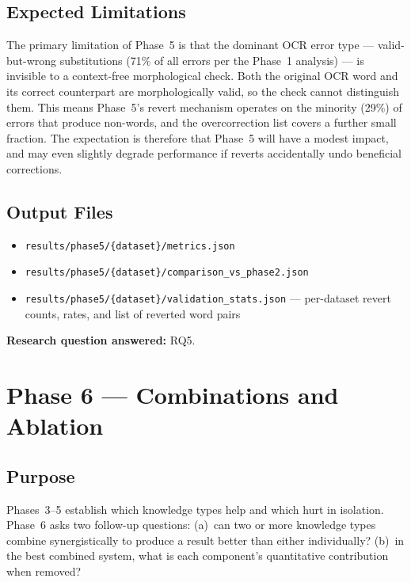\subsection{Expected Limitations}

The primary limitation of Phase~5 is that the dominant OCR error type ---
valid-but-wrong substitutions (71\% of all errors per the Phase~1 analysis)
--- is invisible to a context-free morphological check. Both the original
OCR word and its correct counterpart are morphologically valid, so the
check cannot distinguish them. This means Phase~5's revert mechanism
operates on the minority (29\%) of errors that produce non-words, and the
overcorrection list covers a further small fraction. The expectation is
therefore that Phase~5 will have a modest impact, and may even slightly
degrade performance if reverts accidentally undo beneficial corrections.

\subsection{Output Files}
\begin{itemize}
  \item \texttt{results/phase5/\{dataset\}/metrics.json}
  \item \texttt{results/phase5/\{dataset\}/comparison\_vs\_phase2.json}
  \item \texttt{results/phase5/\{dataset\}/validation\_stats.json} ---
        per-dataset revert counts, rates, and list of reverted word pairs
\end{itemize}

\noindent
\textbf{Research question answered:} RQ5.

\section{Phase 6 --- Combinations and Ablation}
\label{sec:phase6}

\subsection{Purpose}
\label{subsec:phase6_purpose}

Phases~3--5 establish which knowledge types help and which hurt in isolation.
Phase~6 asks two follow-up questions:
(a)~can two or more knowledge types combine synergistically to produce a result
better than either individually?
(b)~in the best combined system, what is each component's quantitative
contribution when removed?


